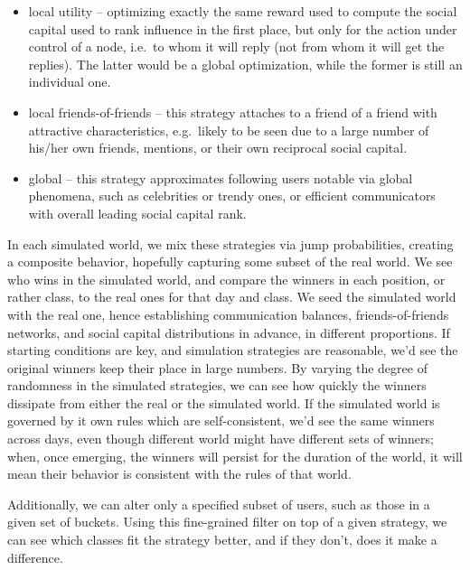 \documentclass[10pt,oneside]{memoir}
\begin{document}
\begin{Spacing}{2}
\begin{itemize}


\item local utility -- optimizing exactly the same reward used to compute the social capital used to rank influence in the first place, but only for the action under control of a node, i.e.\ to whom it will reply (not from whom it will get the replies).  The latter would be a global optimization, while the former is still an individual one.

\item local friends-of-friends -- this strategy attaches to a friend of a friend with attractive characteristics, e.g.\ likely to be seen due to a large number of his/her own friends, mentions, or their own reciprocal social capital.

\item global -- this strategy approximates following users notable via global phenomena, such as celebrities or trendy ones, or efficient communicators with overall leading social capital rank.
\end{itemize}

In each simulated world, we mix these strategies via jump probabilities, creating a composite behavior, hopefully capturing some subset of the real world.  We see who wins in the simulated world, and compare the winners in each position, or rather class, to the real ones for that day and class.  We seed the simulated world with the real one, hence establishing communication balances, friends-of-friends networks, and social capital distributions in advance, in different proportions.  If starting conditions are key, and simulation strategies are reasonable, we'd see the original winners keep their place in large numbers.  By varying the degree of randomness in the simulated strategies, we can see how quickly the winners dissipate from either the real or the simulated world.  If the simulated world is governed by it own rules which are self-consistent, we'd see the same winners across days, even though different world might have different sets of winners; when, once emerging, the winners will persist for the duration of the world, it will mean their behavior is consistent with the rules of that world.


Additionally, we can alter only a specified subset of users, such as those in a given set of buckets.  Using this fine-grained filter on top of a given strategy, we can see which classes fit the strategy better, and if they don't, does it make a difference.



\end{Spacing}
\end{document}
